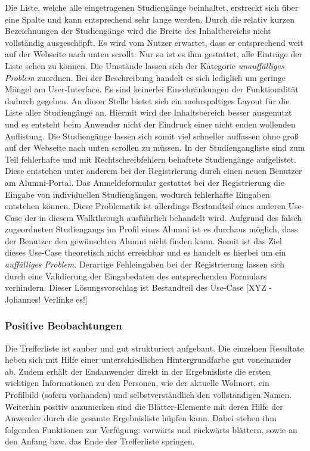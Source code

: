 {
	Die Liste, welche alle eingetragenen Studiengänge beinhaltet, erstreckt sich über eine Spalte und kann entsprechend sehr lange werden. Durch die relativ kurzen Bezeichnungen der Studiengänge wird die Breite des Inhaltbereichs nicht vollständig ausgeschöpft. Es wird vom Nutzer erwartet, dass er entsprechend weit auf der Webseite nach unten scrollt. Nur so ist es ihm gestattet, alle Einträge der Liste sehen zu können.
}
{
	Die Umstände lassen sich der Kategorie \emph{unauffälliges Problem} zuordnen. Bei der Beschreibung handelt es sich lediglich um geringe Mängel am User-Interface. Es sind keinerlei Einschränkungen der Funktionalität dadurch gegeben.
}
{
	An dieser Stelle bietet sich ein mehrspaltiges Layout für die Liste aller Studiengänge an. Hiermit wird der Inhaltsbereich besser ausgenutzt und es entsteht beim Anwender nicht der Eindruck einer nicht enden wollenden Auflistung. Die Studiengänge lassen sich somit viel schneller auffassen ohne groß auf der Webseite nach unten scrollen zu müssen.
}
{
	In der Studiengangliste sind zum Teil fehlerhafte und mit Rechtschreibfehlern behaftete Studiengänge aufgelistet. Diese entstehen unter anderem bei der Registrierung durch einen neuen Benutzer am Alumni-Portal. Das Anmeldeformular gestattet bei der Registrierung die Eingabe von individuellen Studiengängen, wodurch fehlerhafte Eingaben entstehen können. Diese Problematik ist allerdings Bestandteil eines anderen Use-Case der in diesem Walkthrough ausführlich behandelt wird.
}
{
	Aufgrund des falsch zugeordneten Studiengangs im Profil eines Alumni ist es durchaus möglich, dass der Benutzer den gewünschten Alumni nicht finden kann. Somit ist das Ziel dieses Use-Case theoretisch nicht erreichbar und es handelt es hierbei um ein \emph{auffälliges Problem}.
}
{
	Derartige Fehleingaben bei der Registrierung lassen sich durch eine Validierung der Eingabedaten des entsprechenden Formulars verhindern. Dieser Lösungsvorschlag ist Bestandteil des Use-Case [XYZ - Johannes! Verlinke es!]
}


\subsubsection*{Positive Beobachtungen}
Die Trefferliste ist sauber und gut strukturiert aufgebaut. Die einzelnen Resultate heben sich mit Hilfe einer unterschiedlichen Hintergrundfarbe gut voneinander ab. Zudem erhält der Endanwender direkt in der Ergebnisliste die ersten wichtigen Informationen zu den Personen, wie der aktuelle Wohnort, ein Profilbild (sofern vorhanden) und selbstverständlich den vollständigen Namen. Weiterhin positiv anzumerken sind die Blätter-Elemente mit deren Hilfe der Anwender durch die gesamte Ergebnisliste hüpfen kann. Dabei stehen ihm folgenden Funktionen zur Verfügung: vorwärts und rückwärts blättern, sowie an den Anfang bzw. das Ende der Trefferliste springen. 

